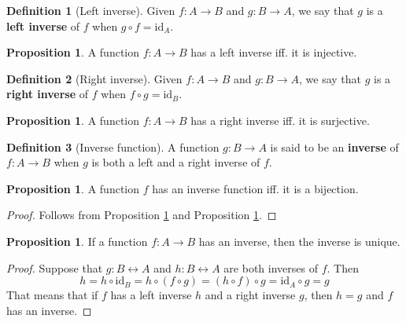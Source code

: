 \documentclass[tikz,12pt,a4paper]{article}
\theoremstyle{definition}
\newtheorem{proposition}[theorem]{Proposition}
\newtheorem{definition}{Definition}[section]
\begin{document}
\begin{definition}[Left inverse]
	Given $f : A \longrightarrow B$ and $g : B \longrightarrow A$, we say that $g$ is a \textbf{left inverse} of $f$ when $g \circ f = \text{id}_A$.
\end{definition}

\begin{proposition}\label{propleftinv}
	A function $f : A \longrightarrow B$ has a left inverse iff. it is injective.
\end{proposition}

\begin{definition}[Right inverse]
	Given $f : A \longrightarrow B$ and $g : B \longrightarrow A$, we say that $g$ is a \textbf{right inverse} of $f$ when $f \circ g = \text{id}_B$.
\end{definition}

\begin{proposition}\label{proprightinv}
	A function $f : A \longrightarrow B$ has a right inverse iff. it is surjective.
\end{proposition}

\begin{definition}[Inverse function]
	A function $g : B \longrightarrow A$ is said to be an \textbf{inverse} of $f : A \longrightarrow B$ when $g$ is both a left and a right inverse of $f$.
\end{definition}

\begin{proposition}
	A function $f$ has an inverse function iff. it is a bijection.
\end{proposition}

\begin{proof}
	Follows from Proposition \ref{propleftinv} and Proposition \ref{proprightinv}.
\end{proof}

\begin{proposition}
	If a function $f : A \longrightarrow B$ has an inverse, then the inverse is unique.
\end{proposition}

\begin{proof}
	Suppose that $g : B \longleftrightarrow A$ and $h : B \longleftrightarrow A$ are both inverses of $f$. Then
	\[ h = h \circ \text{id}_B = h \circ (f \circ g) = (h \circ f) \circ g = \text{id}_A \circ g = g \]
	That means that if $f$ has a left inverse $h$ and a right inverse $g$, then $h = g$ and $f$ has an inverse.
\end{proof}
\end{document}
